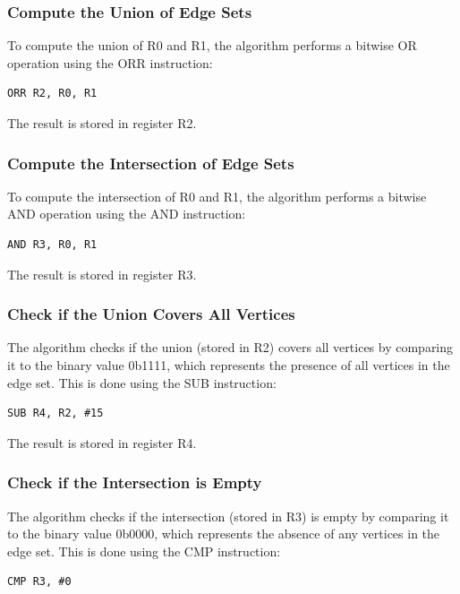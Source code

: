 \subsubsection{Compute the Union of Edge Sets}

To compute the union of R0 and R1, the algorithm performs a bitwise OR operation using the ORR instruction:

\begin{verbatim}
ORR R2, R0, R1
\end{verbatim}

The result is stored in register R2.

\subsubsection{Compute the Intersection of Edge Sets}

To compute the intersection of R0 and R1, the algorithm performs a bitwise AND operation using the AND instruction:

\begin{verbatim}
AND R3, R0, R1
\end{verbatim}

The result is stored in register R3.

\subsubsection{Check if the Union Covers All Vertices}

The algorithm checks if the union (stored in R2) covers all vertices by comparing it to the binary value 0b1111, which represents the presence of all vertices in the edge set. This is done using the SUB instruction:

\begin{verbatim}
SUB R4, R2, #15
\end{verbatim}

The result is stored in register R4.

\subsubsection{Check if the Intersection is Empty}

The algorithm checks if the intersection (stored in R3) is empty by comparing it to the binary value 0b0000, which represents the absence of any vertices in the edge set. This is done using the CMP instruction:

\begin{verbatim}
CMP R3, #0
\end{verbatim}

